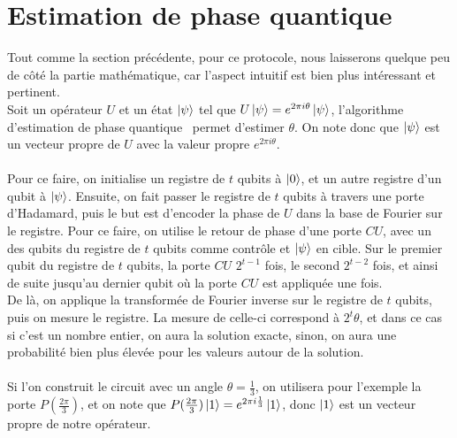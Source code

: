 \section{Estimation de phase quantique}\label{sec:estimation-de-phase-quantique}

Tout comme la section précédente, pour ce protocole, nous laisserons quelque peu de
côté la partie mathématique, car l'aspect intuitif est bien plus intéressant et
pertinent.\\
Soit un opérateur $U$ et un état $\ket{\psi}$ tel que $U\ket{\psi} = e^{2\pi i \theta}\ket{\psi}$,
l'algorithme d'estimation de phase quantique~\cite{wiki:qpe} permet d'estimer $\theta$.
On note donc que $\ket{\psi}$ est un vecteur propre de $U$ avec la valeur propre
$e^{2\pi i \theta}$.\\ \\
Pour ce faire, on initialise un registre de $t$ qubits à $\ket{0}$, et un autre
registre d'un qubit à $\ket{\psi}$.
Ensuite, on fait passer le registre de $t$ qubits à travers une porte d'Hadamard,
puis le but est d'encoder la phase de $U$ dans la base de Fourier sur le registre.
Pour ce faire, on utilise le retour de phase d'une porte $CU$, avec un des qubits
du registre de $t$ qubits comme contrôle et $\ket{\psi}$ en cible.
Sur le premier qubit du registre de $t$ qubits, la porte $CU$ $2^{t-1}$ fois, le second
$2^{t-2}$ fois, et ainsi de suite jusqu'au dernier qubit où la porte $CU$ est appliquée
une fois.\\
De là, on applique la transformée de Fourier inverse sur le registre de $t$ qubits,
puis on mesure le registre.
La mesure de celle-ci correspond à $2^t \theta$, et dans ce cas si c'est un nombre
entier, on aura la solution exacte, sinon, on aura une probabilité bien plus élevée pour
les valeurs autour de la solution.\\ \\
Si l'on construit le circuit avec un angle $\theta = \frac{1}{3}$, on utilisera pour
l'exemple la porte $P(\frac{2 \pi}{3})$, et on note que $P(\frac{2 \pi}{3})\ket{1} = e^{2\pi i \frac{1}{3}}\ket{1}$,
donc $\ket{1}$ est un vecteur propre de notre opérateur.

